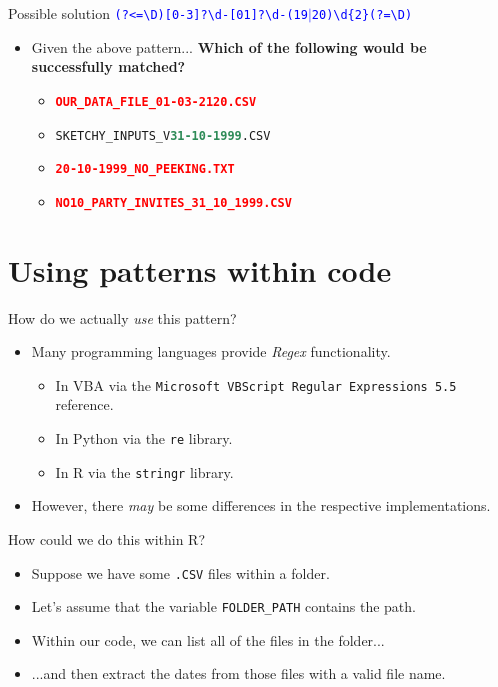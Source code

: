 \documentclass[
	usenames,
	dvipsnames,
	handout
] {beamer}
\newcommand{\reDigit}{\textbackslash{}d}
\newcommand{\reNonDigit}{\textbackslash{}D}
\newcommand{\rePattern}[1]{{\Large\texttt{\textcolor{blue}{#1}}}}
\begin{document}
\begin{frame}{Possible solution}
	\rePattern{(?\textless=\reNonDigit)[0-3]?\reDigit-[01]?\reDigit-(19$|$20)\reDigit\{2\}(?=\reNonDigit)}
	\medskip
	
	\begin{itemize}[label=\textbullet]
		\item Given the above pattern... \textbf{Which of the following would be successfully matched?}
		      \begin{itemize}[label=\textendash]
				\item<2-> \texttt{\textbf<3->{\textcolor<3->{red}{OUR\_DATA\_FILE\_01-03-2120.CSV}}}
			      	\item<4-> \texttt{SKETCHY\_INPUTS\_V\textbf<5->{\textcolor<5->{SeaGreen}{31-10-1999}}.CSV}
			      	\item<6-> \texttt{\textbf<7->{\textcolor<7->{red}{20-10-1999\_NO\_PEEKING.TXT}}}
			      	\item<8-> \texttt{\textbf<9->{\textcolor<9->{red}{NO10\_PARTY\_INVITES\_31\_10\_1999.CSV}}}
		      \end{itemize}
	\end{itemize}
\end{frame}

\section{Using patterns within code}
\begin{frame}{How do we actually \emph{use} this pattern?}
	\begin{itemize}[label=\textbullet]
		\item Many programming languages provide \emph{Regex} functionality.
			\pause
		\begin{itemize}[label=\textendash]
			\item In VBA via the \texttt{Microsoft VBScript Regular Expressions 5.5} reference.
				\pause
			\item In Python via the \texttt{re} library.
				\pause
			\item In R via the \texttt{stringr} library.
				\pause
		\end{itemize}			
			
		\item However, there \emph{may} be some differences in the respective implementations.
	\end{itemize}
\end{frame}

\begin{frame}{How could we do this within R?}
	\begin{itemize}[label=\textbullet]
		\item Suppose we have some \texttt{.CSV} files within a folder.
			\pause
		\item Let's assume that the variable \texttt{FOLDER\_PATH} contains the path.
			\pause
		\item Within our code, we can list all of the files in the folder...
			\pause
		\item ...and then extract the dates from those files with a valid file name.
	\end{itemize}
\end{frame}
\end{document}
